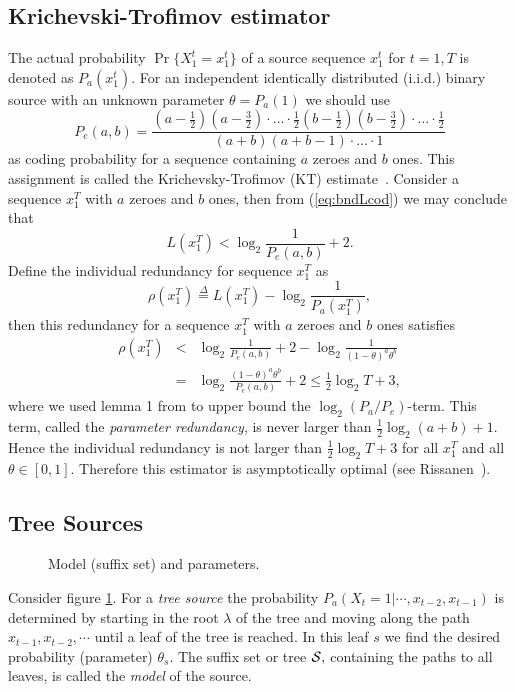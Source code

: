 \documentclass[10pt,conference]{IEEEtran}
\newcommand{\xT}{x^{T}_{1}}
\newcommand{\xt}{x^{t}_{1}}
\newcommand{\Xt}{X^{t}_{1}}
\newcommand{\half}{\frac{1}{2}}
\newcommand{\cS}{{\cal{S}}}
\newcommand{\define}{\stackrel{\Delta}{=}}
\begin{document}
\subsection{Krichevski-Trofimov estimator}
The actual probability $\Pr\{\Xt=\xt\}$ of a source sequence $\xt$ for $t=1,T$ is denoted as $P_a(\xt)$.
For an independent identically distributed (i.i.d.) binary source with an unknown parameter $\theta = P_a(1)$ we should use
\begin{equation}
 \label{eq:KT}
P_{e}(a,b) = \frac{(a-\half)(a-\frac{3}{2})\cdot \dots \cdot \half (b-\half)(b-\frac{3}{2})\cdot \dots \cdot \half} {(a+b)(a+b-1)\cdot \dots \cdot 1}
\end{equation}
as coding probability for a sequence containing $a$ zeroes and $b$ ones.
This assignment is called the Krichevsky-Trofimov (KT) estimate~\cite{KriTro81}.
Consider a sequence $\xT$ with $a$ zeroes and $b$ ones, then from (\ref{eq:bndLcod}) we may conclude that
\begin{equation}
  \label{eq:bndLonepar}
  L(\xT) < \log_2 \frac{1}{P_{e}(a,b)} + 2.
\end{equation}
Define the individual redundancy for sequence $\xT$ as
\begin{equation}
  \label{eq:defrho}
\rho(\xT) \define L(\xT) - \log_2 \frac{1}{P_a(\xT)},
\end{equation}
then this redundancy for a sequence $\xT$ with $a$ zeroes and $b$ ones satisfies
\begin{eqnarray}
  \label{bndredonepar}
\rho(\xT) &<& \log_2\frac{1}{P_{e}(a,b)} + 2 -
\log_2\frac{1}{(1-\theta)^{a}\theta^{b}} \nonumber \\
&=& \log_2\frac{(1-\theta)^{a}\theta^{b}}{P_{e}(a,b)} + 2 \leq \frac{1}{2}\log_2 T + 3,
\end{eqnarray}
where we used lemma 1 from \cite{WilShtTja95} to upper bound the $\log_2( P_{a}/P_{e} )$-term.
This term, called the {\em parameter redundancy}, is never larger than $\frac{1}{2}\log_2(a+b) + 1$.
Hence the individual redundancy is not larger than $\frac{1}{2}\log_2 T + 3$ for all $\xT$ and all $\theta \in [0,1]$.
Therefore this estimator is asymptotically optimal (see Rissanen~\cite{Ris84}).

\subsection{Tree Sources}
\begin{figure}
\centering

\caption{Model (suffix set) and parameters.}
\label{fig:tree}
\end{figure}
Consider figure \ref{fig:tree}.
For a {\em tree source} the probability $P_{a}(X_{t}=1|\cdots,x_{t-2},x_{t-1})$ is determined by starting in the root $\lambda$ of the tree and moving along the path $x_{t-1}, x_{t-2}, \cdots$ until a leaf of the tree is reached.
In this leaf $s$ we find the desired probability (parameter) $\theta_{s}$.
The suffix set or tree $\cS,$ containing the paths to all leaves, is called the {\em model} of the source.
\end{document}
